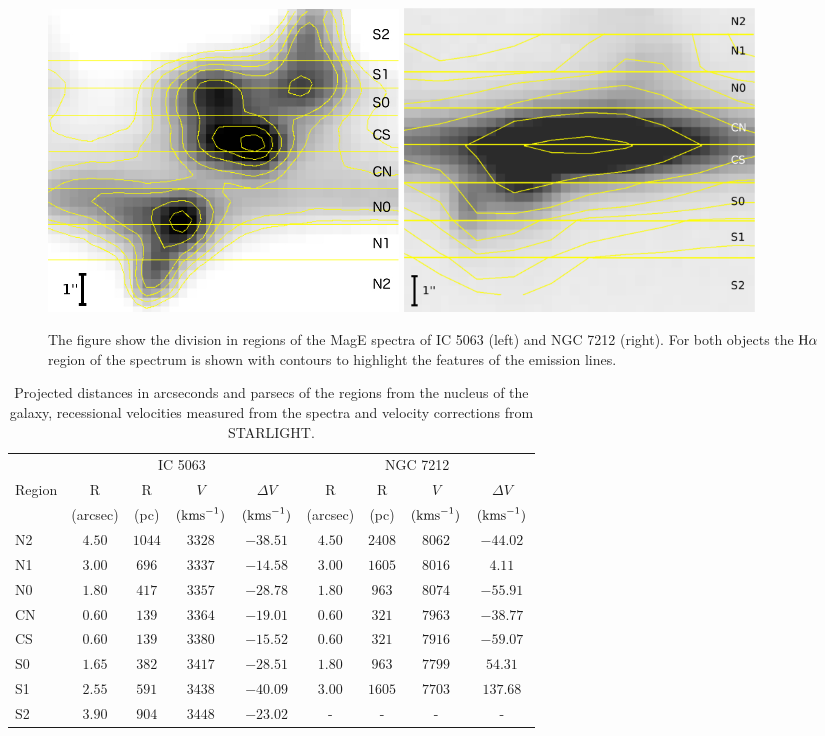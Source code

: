 \documentclass[../main.tex]{subfiles}
\begin{document}
\begin{figure}
\centering
\includegraphics[width=0.45\textwidth]{images/paper1/IC5063_reg.jpg} 
\quad\quad
\includegraphics[width=0.45\textwidth]{images/paper1/NGC7212_reg.pdf}
\caption[]{The figure show the division in regions of the MagE spectra of IC 5063 (left) and NGC 7212 (right). For both objects the $\Ha$ region of the spectrum is shown with contours to highlight the features of the emission lines.}
\label{fig:sub_regions}
\end{figure}

\begin{table}
\caption[]{Projected distances in arcseconds and parsecs of the regions from the nucleus of the galaxy, recessional velocities measured from the spectra and velocity corrections from STARLIGHT.}
\label{tab:reg}
\centering
\small
\begin{tabular}[width=\columnwidth]{lcccccccc}
\hline
& \multicolumn{4}{c}{IC 5063}&\multicolumn{4}{c}{NGC 7212}\\
Region& R&R&$V$&$\Delta V$&R&R&$V$&$\Delta V$\\
& (arcsec)& (pc)&$(\si{\kms})$&$(\si{\kms})$&(arcsec)&(pc)&$(\si{\kms})$&$(\si{\kms})$\\
\hline
N2&$4.50$&$1044$&$3328$&$-38.51$&$4.50$&$2408$&$8062$&$-44.02$\\
N1&$3.00$&$696$&$3337$&$-14.58$&$3.00$&$1605$&$8016$&$4.11$\\
N0&$1.80$&$417$&$3357$&$-28.78$&$1.80$&$963$&$8074$&$-55.91$\\
CN&$0.60$&$139$&$3364$&$-19.01$&$0.60$&$321$&$7963$&$-38.77$\\
CS&$0.60$&$139$&$3380$&$-15.52$&$0.60$&$321$&$7916$&$-59.07$\\
S0&$1.65$&$382$&$3417$&$-28.51$&$1.80$&$963$&$7799$&$54.31$\\
S1&$2.55$&$591$&$3438$&$-40.09$&$3.00$&$1605$&$7703$&$137.68$\\
S2&$3.90$&$904$&$3448$&$-23.02$&-&-&-&-\\
\hline
\end{tabular}
\normalsize
\end{table}
\end{document}
